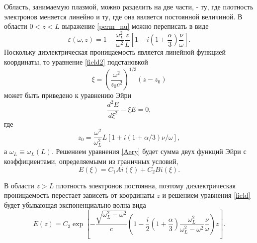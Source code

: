 \documentclass[12pt,a4paper]{article}
\numberwithin{equation}{section}
\begin{document}
Область, занимаемую плазмой, можно разделить на две части, - ту, где плотность электронов меняется линейно и ту, где она является постоянной величиной. В области $0<z<L$ выражение \eqref{perm_nu} можно переписать в виде
\begin{equation}
    \varepsilon(\omega, z) = 1 - \frac{\omega_L^2}{\omega^2}\frac{z}{L}\left[1-i\left(1+\frac{\alpha}{3}\right)\frac{\nu}{\omega}\right].
\end{equation}
Поскольку диэлектрическая проницаемость является линейной функцией координаты, то уравнение \eqref{field2} подстановкой 
\begin{equation}
    \xi = \left(\frac{\omega^2}{z_0 c^2}\right)^{1/3}\left(z-z_0\right)
\end{equation}
может быть приведено к уравнению Эйри
\begin{equation}
    \label{Aery}
    \frac{d^2 E}{d\xi^2}-\xi E = 0,
\end{equation}
где 
\begin{equation}
    z_0 = \frac{\omega^2}{\omega_L^2}L\left[1+i\left(1+\alpha/3\right)\nu/\omega\right],
\end{equation}
а $\omega_L \equiv \omega_L\left(L\right)$. Решением уравнения \eqref{Aery} будет сумма двух функций Эйри  с коэффициентами, определяемыми из граничных условий,
\begin{equation}
    \label{field_L}
    E\left(\xi\right) = C_1 Ai\left(\xi\right)+C_2 Bi\left(\xi\right).
\end{equation}

В области $z>L$ плотность электронов постоянна, поэтому диэлектрическая проницаемость перестает зависеть от координаты $z$ и решением уравнения \eqref{field} будет убывающая экспоненциально волна вида
\begin{equation}
    \label{field_inf}
    E\left(z\right) = C_3\exp\left[-\frac{\sqrt{\omega_L^2-\omega^2}}{c}\left(1-\frac{i}{2}\left(1+\frac{\alpha}{3}\right)\frac{\omega_L^2}{\omega_L^2-\omega^2}\frac{\nu}{\omega}\right)z\right].
\end{equation}
\end{document}
